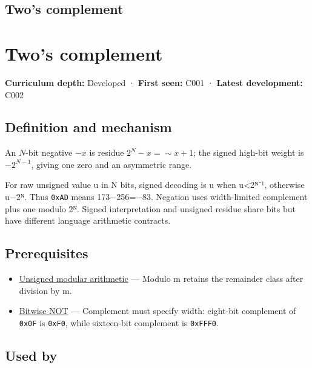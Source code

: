 \hypertarget{appendix-4fbc03d20829}{}
\section*{Two's complement}
\chapter{Two's complement}\label{appendix-4fbc03d20829-twos-complement}

\textbf{Curriculum depth:} Developed · \textbf{First seen:} C001 · \textbf{Latest development:} C002

\section{Definition and mechanism}\label{appendix-4fbc03d20829-definition-and-mechanism}

An \(N\)-bit negative \(-x\) is residue \(2^N-x=\sim x+1\); the signed high-bit weight is \(-2^{N-1}\), giving one zero and an asymmetric range.

For raw unsigned value u in N bits, signed decoding is u when u\textless2ᴺ⁻¹, otherwise u−2ᴺ. Thus \texttt{0xAD} means 173−256=−83. Negation uses width-limited complement plus one modulo 2ᴺ. Signed interpretation and unsigned residue share bits but have different language arithmetic contracts.

\section{Prerequisites}\label{appendix-4fbc03d20829-prerequisites}

\begin{itemize}
\tightlist
\item
  \hyperref[appendix-c99977d88b33]{Unsigned modular arithmetic} --- Modulo m retains the remainder class after division by m.
\item
  \hyperref[appendix-8f38927cfc54]{Bitwise NOT} --- Complement must specify width: eight-bit complement of \texttt{0x0F} is \texttt{0xF0}, while sixteen-bit complement is \texttt{0xFFF0}.
\end{itemize}

\section{Used by}\label{appendix-4fbc03d20829-used-by}

